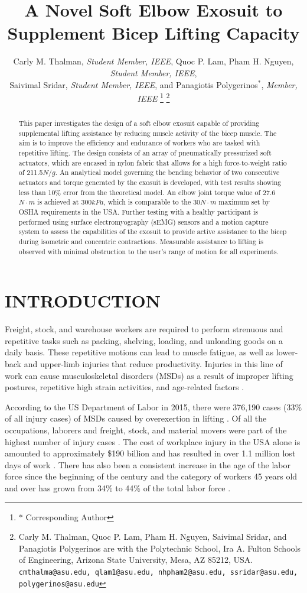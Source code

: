 \documentclass[letterpaper, 10 pt, conference]{ieeeconf}  %
\title{\LARGE \bf
A Novel Soft Elbow Exosuit to Supplement Bicep Lifting Capacity  
}
\author{Carly M. Thalman, \textit{Student Member, IEEE}, Quoc P. Lam, Pham H. Nguyen, \textit{Student Member, IEEE}, 
\\Saivimal Sridar, \textit{Student Member, IEEE}, and Panagiotis Polygerinos$^{*}$, \textit{Member, IEEE}%
\thanks{$*$ Corresponding Author}%
\thanks{Carly M. Thalman, Quoc P. Lam, Pham H. Nguyen, Saivimal Sridar, and Panagiotis Polygerinos are with the Polytechnic School, Ira A. Fulton Schools of Engineering, Arizona State University, Mesa, AZ 85212, USA.
        {\tt\small cmthalma@asu.edu, qlam1@asu.edu, nhpham2@asu.edu, ssridar@asu.edu, polygerinos@asu.edu}}%
}
\begin{document}
\maketitle
\thispagestyle{empty}
\pagestyle{empty}


\begin{abstract}

This paper investigates the design of a soft elbow exosuit capable of providing supplemental lifting assistance by reducing muscle activity of the bicep muscle.  The aim is to improve the efficiency and endurance of workers who are tasked with repetitive lifting. The design consists of an array of pneumatically pressurized soft actuators, which are encased in nylon fabric that allows for a high force-to-weight ratio of 211.5${N}/{g}$. An analytical model governing the bending behavior of two consecutive actuators and torque generated by the exosuit is developed, with test results showing less than 10\% error from the theoretical model.  An elbow joint torque value of 27.6$N{\cdot}m$ is achieved at 300$kPa$, which is comparable to the 30$N{\cdot}m$ maximum set by OSHA requirements in the USA. Further testing with a healthy participant is performed using surface electromyography (sEMG) sensors and a motion capture system to assess the capabilities of the exosuit to provide active assistance to the bicep during isometric and concentric contractions. Measurable assistance to lifting is observed with minimal obstruction to the user's range of motion for all experiments. 

\end{abstract}

\section{INTRODUCTION}

Freight, stock, and warehouse workers are required to perform strenuous and repetitive tasks such as packing, shelving, loading, and unloading goods on a daily basis. These repetitive motions can lead to muscle fatigue, as well as lower-back and upper-limb injuries that reduce productivity. Injuries in this line of work can cause musculoskeletal disorders (MSDs) as a result of improper lifting postures, repetitive high strain activities, and age-related factors \cite{BLS2017}.

According to the US Department of Labor in 2015, there were 376,190 cases (33\% of all injury cases) of MSDs caused by overexertion in lifting \cite{BLS2016}. Of all the occupations, laborers and freight, stock, and material movers were part of the highest number of injury cases \cite{BLS2016}. The cost of workplace injury in the USA alone is amounted to approximately \$190 billion and has resulted in over 1.1 million lost days of work \cite{Leigh2011}. There has also been a consistent increase in the age of the labor force since the beginning of the century and the category of workers 45 years old and over has grown from 34\% to 44\% of the total labor force \cite{Mislinski2017}. 
\end{document}
